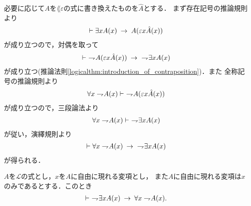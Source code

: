 	\begin{sketch}
		必要に応じて$A$を$\lang{\varepsilon}$の式に書き換えたものを$\hat{A}$とする．
		まず存在記号の推論規則より
		\begin{align}
			\vdash \exists x A(x) \hspace{0.25em}\rightarrow\hspace{0.25em} A(\varepsilon x \hat{A}(x))
		\end{align}
		が成り立つので，対偶を取って
		\begin{align}
			\vdash\ \rightharpoondown\hspace{-0.25em} A(\varepsilon x \hat{A}(x)) 
			\hspace{0.25em}\rightarrow\hspace{0.25em}\ \rightharpoondown\hspace{-0.25em} \exists x A(x)
		\end{align}
		が成り立つ(推論法則\ref{logicalthm:introduction_of_contraposition})．また
		全称記号の推論規則より
		\begin{align}
			\forall x \rightharpoondown\hspace{-0.25em} A(x) \vdash\ \rightharpoondown\hspace{-0.25em} A(\varepsilon x \hat{A}(x))
		\end{align}
		が成り立つので，三段論法より
		\begin{align}
			\forall x \rightharpoondown\hspace{-0.25em} A(x) \vdash\ \rightharpoondown\hspace{-0.25em} \exists x A(x)
		\end{align}
		が従い，演繹規則より
		\begin{align}
			\vdash \forall x \rightharpoondown\hspace{-0.25em} A(x) \hspace{0.25em}\rightarrow\hspace{0.25em}\ \rightharpoondown\hspace{-0.25em} \exists x A(x)
		\end{align}
		が得られる．
		\QED
	\end{sketch}
	
	\begin{screen}
		\begin{logicalthm}
		\label{logicalthm:strong_De_Morgan_law_for_quantifiers_2}
			$A$を$\mathcal{L}$の式とし，$x$を$A$に自由に現れる変項とし，
			また$A$に自由に現れる変項は$x$のみであるとする．このとき
			\begin{align}
				\vdash\ \rightharpoondown\hspace{-0.25em} \exists x A(x) \hspace{0.25em}\rightarrow\hspace{0.25em} \forall x \rightharpoondown\hspace{-0.25em} A(x).
			\end{align}
		\end{logicalthm}
	\end{screen}
	
